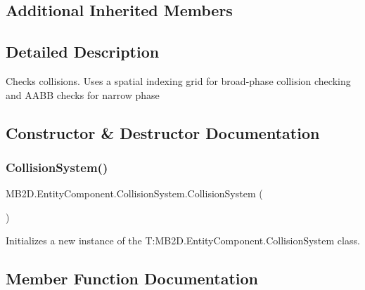 \subsection*{Additional Inherited Members}


\subsection{Detailed Description}
Checks collisions. Uses a spatial indexing grid for broad-\/phase collision checking and A\+A\+BB checks for narrow phase 



\subsection{Constructor \& Destructor Documentation}
\hypertarget{class_m_b2_d_1_1_entity_component_1_1_collision_system_ac6452aea90e8ee3376b8ea0e089bebc1}{}\label{class_m_b2_d_1_1_entity_component_1_1_collision_system_ac6452aea90e8ee3376b8ea0e089bebc1} 
\subsubsection{\texorpdfstring{Collision\+System()}{CollisionSystem()}}
{\footnotesize\ttfamily M\+B2\+D.\+Entity\+Component.\+Collision\+System.\+Collision\+System (\begin{DoxyParamCaption}{ }\end{DoxyParamCaption})\hspace{0.3cm}{\ttfamily [inline]}}



Initializes a new instance of the T\+:\+M\+B2\+D.\+Entity\+Component.\+Collision\+System class. 



\subsection{Member Function Documentation}
\hypertarget{class_m_b2_d_1_1_entity_component_1_1_collision_system_ad591227767c8b6c66ca3891de04e9050}{}\label{class_m_b2_d_1_1_entity_component_1_1_collision_system_ad591227767c8b6c66ca3891de04e9050} 
